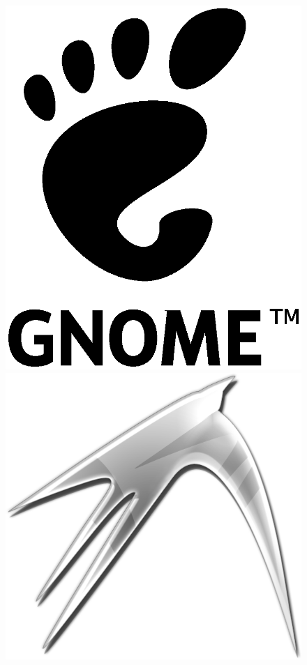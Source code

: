 \begin{figure}[ht!]
	
	\includegraphics[width=0.2\paperwidth]{./img/desktops/gnome}
	
	\includegraphics[width=0.2\paperwidth]{./img/desktops/lxde}

\end{figure}

